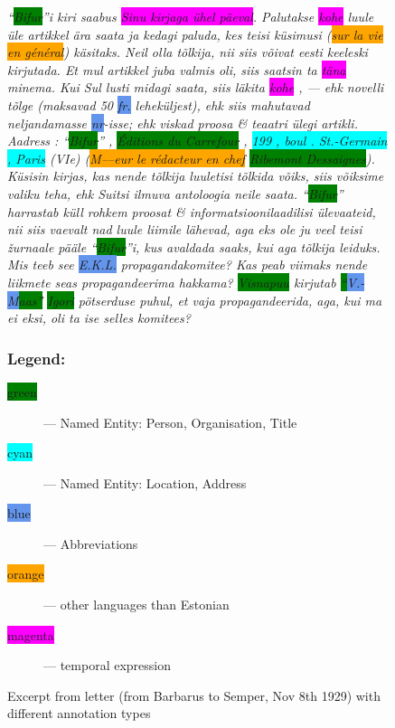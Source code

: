 \documentclass[runningheads]{llncs}
\begin{document}
\begin{figure}
  \centering
  \begin{minipage}{0.8\textwidth}
\itshape
  ``\colorbox{Green}{Bifur}''i kiri saabus \colorbox{Magenta}{Sinu kirjaga \"uhel p\"aeval}. Palutakse \colorbox{Magenta}{kohe} luule \"ule artikkel \"ara saata ja kedagi paluda, kes teisi k\"usimusi
  (\colorbox{Orange}{sur la vie en g\'en\'eral})
k\"asitaks. Neil olla t\~olkija, nii siis v\~oivat eesti keeleski kirjutada. Et mul artikkel juba valmis oli, siis saatsin ta \colorbox{Magenta}{t\"ana} minema. Kui Sul lusti midagi saata, siis l\"akita \colorbox{Magenta}{kohe} , --- ehk novelli t\~olge (maksavad 50 \colorbox{CornflowerBlue}{fr.} lehek\"uljest), ehk siis mahutavad neljandamasse \colorbox{CornflowerBlue}{nr}-isse; ehk viskad proosa \& teaatri \"ulegi artikli. Aadress : ``\colorbox{Green}{Bifur}'' , \colorbox{Green}{\'Editions du Carrefour} , \colorbox{Cyan}{199 , boul . St.-Germain , Paris} (VIe) (\colorbox{Orange}{M–--eur le r\'edacteur en chef}  \colorbox{Green}{Ribemont Dessaignes}). K\"usisin kirjas, kas nende t\~olkija luuletisi t\~olkida v\~oiks, siis v\~oiksime valiku teha, ehk Suitsi ilmuva antoloogia neile saata. ``\colorbox{Green}{Bifur}'' harrastab k\"ull rohkem proosat \& informatsioonilaadilisi \"ulevaateid, nii siis vaevalt nad luule liimile l\"ahevad, aga eks ole ju veel teisi \v{z}urnaale p\"a\"ale ``\colorbox{Green}{Bifur}''i, kus avaldada saaks, kui aga t\~olkija leiduks. Mis teeb see \colorbox{CornflowerBlue}{E.K.L.} propagandakomitee? Kas peab viimaks nende liikmete seas propagandeerima hakkama? \colorbox{Green}{Visnapuu} kirjutab \colorbox{Green}{``\colorbox{CornflowerBlue}{V.-M}aas''} \colorbox{Green}{Igori} p\"otserduse puhul, et vaja propagandeerida, aga, kui ma ei eksi, oli ta ise selles komitees?

  \end{minipage}
  
  \begin{minipage}{\textwidth}
    \vspace{18pt}
    \subsubsection{Legend:}
    \begin{description}
\item[\colorbox{Green}{green}] --- Named Entity: Person, Organisation, Title
\item[\colorbox{Cyan}{cyan}] --- Named Entity: Location, Address
\item[\colorbox{CornflowerBlue}{blue}] --- Abbreviations
\item[\colorbox{Orange}{orange}] --- other languages than Estonian
\item[\colorbox{Magenta}{magenta}] --- temporal expression
\end{description}
    \end{minipage}
  \caption{Excerpt from letter (from Barbarus to Semper, Nov 8th 1929) with different annotation types}\label{fig1}
\end{figure}
\end{document}
